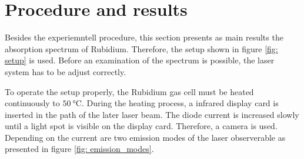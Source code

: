 \section{Procedure and results}
Besides the experiemntell procedure, this section presents as main results the
absorption spectrum of Rubidium. Therefore, the setup shown in figure \ref{fig: setup}
is used. Before an examination of the spectrum is possible, the laser system has to be
adjust correctly.

To operate the setup properly, the Rubidium gas cell must be heated
continuously to $\SI{50}{\degreeCelsius}$. During the heating process, a infrared display
card is inserted in the path of the later laser beam. The diode current is increased slowly until a
light spot is visible on the display card. Therefore, a camera is used.
Depending on the current are
two emission modes of the laser observerable as presented in figure \ref{fig: emission_modes}.
